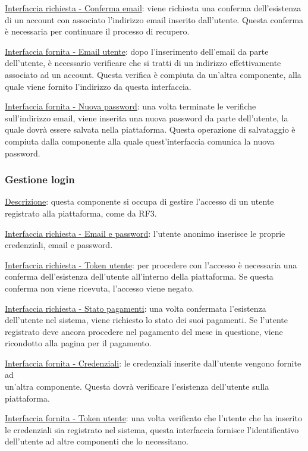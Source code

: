 \documentclass[a4paper,12pt]{article}
\begin{document}
\underline{Interfaccia richiesta - Conferma email}: viene richiesta una conferma dell’esistenza di un account con associato l’indirizzo email inserito dall’utente. Questa conferma è necessaria per continuare il processo di recupero.

\underline{Interfaccia fornita - Email utente}: dopo l’inserimento dell’email da parte dell’utente, è necessario verificare che si tratti di un indirizzo effettivamente associato ad un account. Questa verifica è compiuta da un’altra componente, alla quale viene fornito l’indirizzo da questa interfaccia.

\underline{Interfaccia fornita - Nuova password}: una volta terminate le verifiche sull’indirizzo email, viene inserita una nuova password da parte dell’utente, la quale dovrà essere salvata nella piattaforma. Questa operazione di salvataggio è compiuta dalla componente alla quale quest’interfaccia comunica la nuova password.

\subsubsection{Gestione login}

\underline{Descrizione}: questa componente si occupa di gestire l’accesso di un utente registrato alla piattaforma, come da RF3.

\underline{Interfaccia richiesta - Email e password}: l’utente anonimo inserisce le proprie credenziali, email e password.

\underline{Interfaccia richiesta - Token utente}: per procedere con l’accesso è necessaria una conferma dell’esistenza dell’utente all’interno della piattaforma. Se questa conferma non viene ricevuta, l’accesso viene negato.

\underline{Interfaccia richiesta - Stato pagamenti}: una volta confermata l’esistenza dell’utente nel sistema, viene richiesto lo stato dei suoi pagamenti. Se l’utente registrato deve ancora procedere nel pagamento del mese in questione, viene ricondotto alla pagina per il pagamento.

\underline{Interfaccia fornita - Credenziali}: le credenziali inserite dall’utente vengono fornite ad \\ un’altra componente. Questa dovrà verificare l’esistenza dell’utente sulla piattaforma.

\underline{Interfaccia fornita - Token utente}: una volta verificato che l’utente che ha inserito le credenziali sia registrato nel sistema, questa interfaccia fornisce l’identificativo dell’utente ad altre componenti che lo necessitano.
\end{document}
